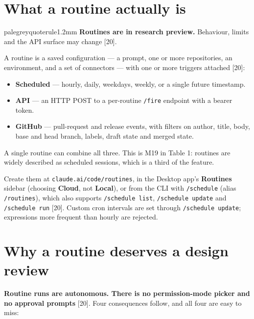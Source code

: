 \documentclass[11pt,a4paper,twoside,openany]{book}
\begin{document}
\FloatBarrier
\setcounter{section}{0}
\section{What a routine actually is}

\begin{calloutbox}{palegrey}{quoterule}{1.2mm}
\textbf{Routines are in research preview.} Behaviour, limits and the API surface may change [20].
\end{calloutbox}

A routine is a saved configuration — a prompt, one or more repositories, an environment, and a set of connectors — with one or more triggers attached [20]:


\begin{itemize}
\item \textbf{Scheduled} — hourly, daily, weekdays, weekly, or a single future timestamp.
\item \textbf{API} — an HTTP POST to a per-routine \texttt{/\allowbreak{}fire} endpoint with a bearer token.
\item \textbf{GitHub} — pull-request and release events, with filters on author, title, body, base and head branch, labels, draft state and merged state.
\end{itemize}

A single routine can combine all three. This is M19 in Table 1: routines are widely described as scheduled sessions, which is a third of the feature.


Create them at \texttt{claude.\allowbreak{}ai/\allowbreak{}code/\allowbreak{}routines}, in the Desktop app's \textbf{Routines} sidebar (choosing \textbf{Cloud}, not \textbf{Local}), or from the CLI with \texttt{/\allowbreak{}schedule} (alias \texttt{/\allowbreak{}routines}), which also supports \texttt{/\allowbreak{}schedule li\allowbreak{}st}, \texttt{/\allowbreak{}schedule up\allowbreak{}date} and \texttt{/\allowbreak{}schedule ru\allowbreak{}n} [20]. Custom cron intervals are set through \texttt{/\allowbreak{}schedule up\allowbreak{}date}; expressions more frequent than hourly are rejected.


\FloatBarrier
\setcounter{section}{1}
\section{Why a routine deserves a design review}

\textbf{Routine runs are autonomous. There is no permission-mode picker and no approval prompts} [20]. Four consequences follow, and all four are easy to miss:
\end{document}
